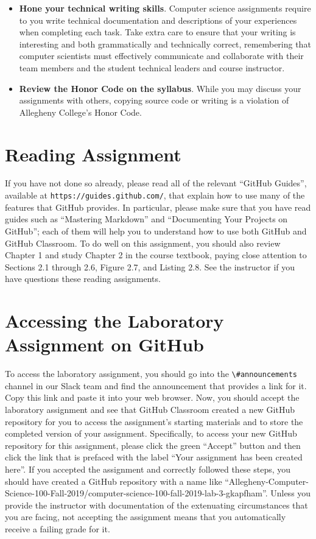 \documentclass[11pt]{article}
\newcommand{\url}[1]{\lstinline{#1}}
\newcommand{\channel}[1]{\lstinline{#1}}
\begin{document}
\begin{itemize}
\item {\bf Hone your technical writing skills}. Computer science assignments
  require to you write technical documentation and descriptions of your
  experiences when completing each task. Take extra care to ensure that your
  writing is interesting and both grammatically and technically correct,
  remembering that computer scientists must effectively communicate and
  collaborate with their team members and the student technical leaders and
  course instructor.

\item {\bf Review the Honor Code on the syllabus}. While you may discuss your
  assignments with others, copying source code or writing is a violation of
  Allegheny College's Honor Code.

\end{itemize}

\section*{Reading Assignment}

If you have not done so already, please read all of the relevant ``GitHub
Guides'', available at \url{https://guides.github.com/}, that explain how to use
many of the features that GitHub provides. In particular, please make sure that
you have read guides such as ``Mastering Markdown'' and ``Documenting Your
Projects on GitHub''; each of them will help you to understand how to use both
GitHub and GitHub Classroom. To do well on this assignment, you should also
review Chapter 1 and study Chapter 2 in the course textbook, paying close
attention to Sections 2.1 through 2.6, Figure 2.7, and Listing 2.8. See the
instructor if you have questions these reading assignments.

\section*{Accessing the Laboratory Assignment on GitHub}

To access the laboratory assignment, you should go into the
\channel{\#announcements} channel in our Slack team and find the announcement
that provides a link for it. Copy this link and paste it into your web browser.
Now, you should accept the laboratory assignment and see that GitHub Classroom
created a new GitHub repository for you to access the assignment's starting
materials and to store the completed version of your assignment. Specifically,
to access your new GitHub repository for this assignment, please click the green
``Accept'' button and then click the link that is prefaced with the label ``Your
assignment has been created here''. If you accepted the assignment and correctly
followed these steps, you should have created a GitHub repository with a name
like
``Allegheny-Computer-Science-100-Fall-2019/computer-science-100-fall-2019-lab-3-gkapfham''.
Unless you provide the instructor with documentation of the extenuating
circumstances that you are facing, not accepting the assignment means that you
automatically receive a failing grade for it.
\end{document}
